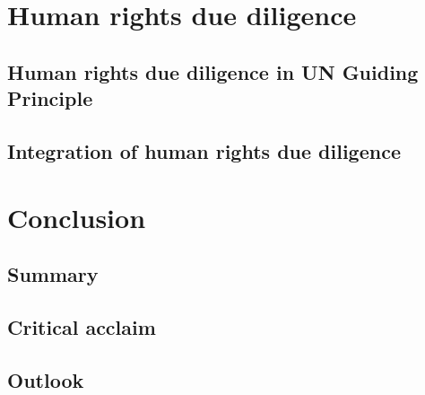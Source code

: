 \documentclass[draft=false
              ,paper=a4
              ,twoside=false
              ,fontsize=12pt
              ,headsepline
              ,BCOR10mm
              ,DIV11
              ]{scrbook}
\begin{document}
\chapter{Human rights due diligence}
\vspace{6pt}
\section{Human rights due diligence in UN Guiding Principle}
\vspace{6pt}

\vspace{12pt}
\section{Integration of human rights due diligence }
\vspace{6pt}









\vspace{12pt}
\chapter{Conclusion}
\vspace{6pt}
\section{Summary}
\vspace{6pt}

\vspace{12pt}
\section{Critical acclaim}
\vspace{6pt}

\vspace{12pt}
\section{Outlook}
\vspace{6pt}






\newpage

\newpage

\end{document}
